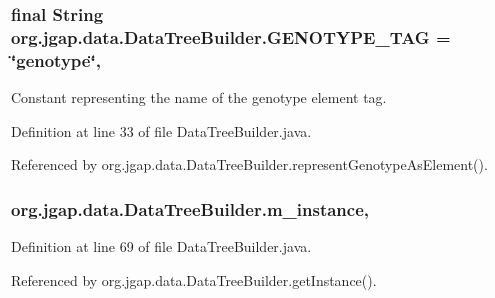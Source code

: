 \hypertarget{classorg_1_1jgap_1_1data_1_1_data_tree_builder_a5151f68709a72808128f5022345b6904}{
\subsubsection[{G\-E\-N\-O\-T\-Y\-P\-E\-\_\-\-T\-A\-G}]{\setlength{\rightskip}{0pt plus 5cm}final String org.\-jgap.\-data.\-Data\-Tree\-Builder.\-G\-E\-N\-O\-T\-Y\-P\-E\-\_\-\-T\-A\-G = \char`\"{}genotype\char`\"{}\hspace{0.3cm}{\ttfamily [static]}, {\ttfamily [private]}}}\label{classorg_1_1jgap_1_1data_1_1_data_tree_builder_a5151f68709a72808128f5022345b6904}
Constant representing the name of the genotype element tag. 

Definition at line 33 of file Data\-Tree\-Builder.\-java.



Referenced by org.\-jgap.\-data.\-Data\-Tree\-Builder.\-represent\-Genotype\-As\-Element().

\hypertarget{classorg_1_1jgap_1_1data_1_1_data_tree_builder_acce17f35d7c0744686b5b7c0758546ad}{
\subsubsection[{m\-\_\-instance}]{ org.\-jgap.\-data.\-Data\-Tree\-Builder.\-m\-\_\-instance\hspace{0.3cm}{\ttfamily [static]}, {\ttfamily [private]}}}\label{classorg_1_1jgap_1_1data_1_1_data_tree_builder_acce17f35d7c0744686b5b7c0758546ad}


Definition at line 69 of file Data\-Tree\-Builder.\-java.



Referenced by org.\-jgap.\-data.\-Data\-Tree\-Builder.\-get\-Instance().

